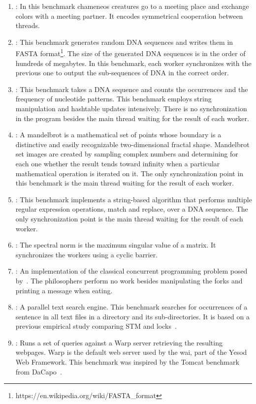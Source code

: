 \begin{enumerate}
  \item \label{bench:chameneos}\chameneos: In this benchmark chameneos creatures go to a meeting place and exchange colors with a meeting partner. It encodes symmetrical cooperation between threads.

  \item \fasta:  This benchmark generates random DNA sequences and writes them in FASTA format\footnote{https://en.wikipedia.org/wiki/FASTA\_format}. The size of the generated DNA sequences is in the order of hundreds of megabytes. In this benchmark,  each worker synchronizes with the previous one to output the sub-sequences of DNA in the correct order.

  \item \knucleotide: This benchmark takes a DNA sequence and counts the occurrences and the frequency of nucleotide patterns. This benchmark employs string manipulation and hashtable updates intensively. There is no synchronization in the program besides the main thread waiting for the result of each worker.

  \item \mandelbrot: A mandelbrot is a mathematical set of points whose boundary is a distinctive and easily recognizable two-dimensional fractal shape. Mandelbrot set images are created by sampling complex numbers and determining for each one whether the result tends toward infinity when a particular mathematical operation is iterated on it. The only synchronization point in this benchmark is the main thread waiting for the result of each worker.

  \item \regex: This benchmark implements a string-based algorithm that performs multiple regular expression operations, match and replace, over a DNA sequence. The only synchronization point is the main thread waiting for the result of each worker.

  \item \label{bench:spectral}\spectral: The spectral norm is the maximum singular value of a matrix. It synchronizes the workers using a cyclic barrier.

  \item \label{bench:dining}\dining: An implementation of the classical concurrent programming problem posed by~. The philosophers perform no work besides manipulating the forks and printing a message when eating.

  \item \label{bench:tsearch}\tsearch: A parallel text search engine. This benchmark searches for occurrences of a sentence in all text files in a directory and its sub-directories. It is based on a previous empirical study comparing STM and locks~\cite{pankratius:2011}.

  \item \label{bench:warp}\warp: Runs a set of queries against a Warp server retrieving the resulting webpages. Warp is the default web server used by the \ac{wai}, part of the Yesod Web Framework. This benchmark was inspired by the Tomcat benchmark from DaCapo~\cite{blackburn:2006}.
\end{enumerate}

